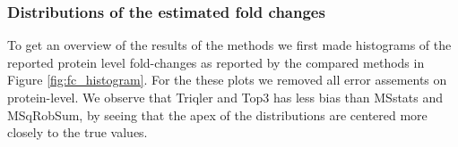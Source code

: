 \documentclass[10pt,letterpaper]{article}
\begin{document}
\subsubsection*{Distributions of the estimated fold changes}

To get an overview of the results of the methods we first made histograms of the reported protein level fold-changes as reported by the compared methods in Figure \ref{fig:fc_histogram}. For the these plots we removed all error assements on protein-level. We observe that Triqler and Top3 has less bias than MSstats and MSqRobSum, by seeing that the apex of the distributions are centered more closely to the true values.  %
\end{document}
